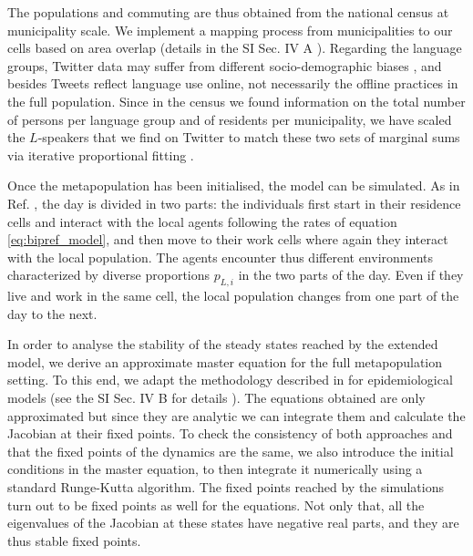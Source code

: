\documentclass[../thesis.tex]{subfiles}
\begin{document}
The populations and commuting are thus obtained from the national census at municipality
scale. We implement a mapping process from
municipalities to our cells based on area overlap (details in the SI Sec. IV A
\cite{supp}). Regarding the language groups, Twitter data may suffer from different
socio-demographic biases
\cite{MisloveUnderstandingDemographics2011,NguyenAudienceUse2015}, and besides Tweets
reflect language use online, not necessarily the offline practices in the full
population. Since in the census we found information on the total number of persons per
language group and of residents per municipality, we have scaled the $L$-speakers that
we find on Twitter to match these two sets of marginal sums via iterative proportional
fitting \cite{DemingLeastSquares1940,FienbergIterativeProcedure1970}.

Once the metapopulation has been initialised, the model can be simulated. As in Ref.
\cite{Fernandez-GraciaVoterModel2014}, the day is divided in two parts: the individuals
first start in their residence cells and interact with the local agents following the
rates of equation \eqref{eq:bipref_model}, and then move to their work cells where again
they interact with the local population. The agents encounter thus different
environments characterized by diverse proportions $p_{L,i}$ in the two parts of the day.
Even if they live and work in the same cell, the local population changes from one part
of the day to the next.

In order to analyse the stability of the steady states reached by the extended model, we
derive an approximate master equation for the full metapopulation setting. To this end,
we adapt the methodology described in 
\cite{SattenspielStructuredEpidemic1995,BalcanModelingSpatial2010} for epidemiological
models (see the SI Sec. IV B for details \cite{supp}). The equations obtained are only
approximated but since they are analytic we can integrate them and calculate the
Jacobian at their fixed points. To check the consistency of both approaches and that the
fixed points of the dynamics are the same, we also introduce the initial conditions in
the master equation, to then integrate it numerically using a standard Runge-Kutta
algorithm. The fixed points reached by the simulations turn out to be fixed points as
well for the equations. Not only that, all the eigenvalues of the Jacobian at these
states have negative real parts, and they are thus stable fixed points.
\end{document}
